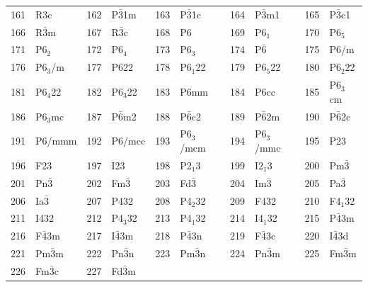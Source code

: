 \documentclass[final,12pt]{article}
\begin{document}
{{{{{{\begin{table}[!h]
\begin{center}
\begin{tabular}{||r|l||r|l||r|l||r|l||r|l||}
161    & R3c                & 
162    & P$\bar{3}$1m       & 
163    & P$\bar{3}$1c       & 
164    & P$\bar{3}$m1       & 
165    & P$\bar{3}$c1       \\
166    & R$\bar{3}$m        & 
167    & R$\bar{3}$c        & 
168    & P6                 & 
169    & P6$_1$             & 
170    & P6$_5$             \\
171    & P6$_2$             & 
172    & P6$_4$             & 
173    & P6$_3$             & 
174    & P$\bar{6}$                & 
175    & P6/m               \\
176    & P6$_3$/m           & 
177    & P622               & 
178    & P6$_1$22           & 
179    & P6$_5$22           & 
180    & P6$_2$22           \\
181    & P6$_4$22           & 
182    & P6$_3$22           & 
183    & P6mm               & 
184    & P6cc               & 
185    & P6$_3$cm           \\
186    & P6$_3$mc           & 
187    & P$\bar{6}$m2       & 
188    & P$\bar{6}$c2       & 
189    & P$\bar{6}$2m       & 
190    & P$\bar{6}$2c       \\
191    & P6/mmm             & 
192    & P6/mcc             & 
193    & P6$_3$/mcm         & 
194    & P6$_3$/mmc         & 
195    & P23                \\
196    & F23                & 
197    & I23                & 
198    & P2$_1$3            & 
199    & I2$_1$3            & 
200    & Pm$\bar{3}$        \\
201    & Pn$\bar{3}$        & 
202    & Fm$\bar{3}$        & 
203    & Fd$\bar{3}$        & 
204    & Im$\bar{3}$        & 
205    & Pa$\bar{3}$        \\
206    & Ia$\bar{3}$        & 
207    & P432               & 
208    & P4$_2$32           & 
209    & F432               & 
210    & F4$_1$32           \\
211    & I432               & 
212    & P4$_3$32           & 
213    & P4$_1$32           & 
214    & I4$_1$32           & 
215    & P$\bar{4}$3m       \\
216    & F$\bar{4}$3m       & 
217    & I$\bar{4}$3m       & 
218    & P$\bar{4}$3n       & 
219    & F$\bar{4}$3c       & 
220    & I$\bar{4}$3d       \\
221    & Pm$\bar{3}$m       & 
222    & Pn$\bar{3}$n       & 
223    & Pm$\bar{3}$n       & 
224    & Pn$\bar{3}$m       & 
225    & Fm$\bar{3}$m       \\
226    & Fm$\bar{3}$c       & 
227    & Fd$\bar{3}$m       & 

\end{tabular}
\end{center}
\end{table}}}}}}}
\end{document}
